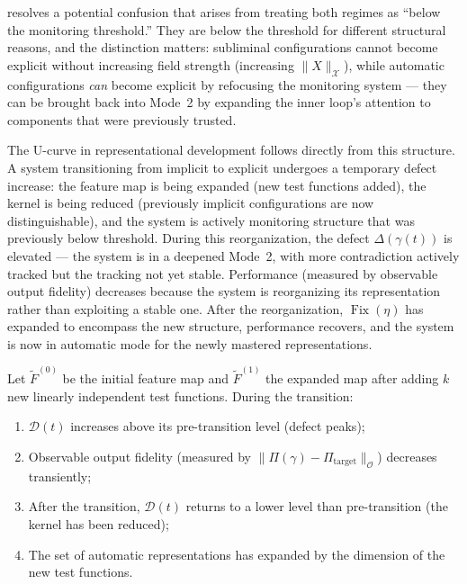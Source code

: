 \documentclass[12pt, oneside]{memoir}
\DeclareMathOperator{\Fix}{Fix}
\newcommand{\X}{\mathcal{X}}
\newcommand{\OO}{\mathcal{O}}
\newcommand{\Ft}{\widetilde{F}}
\newcommand{\nnorm}[1]{\lVert #1 \rVert}
\begin{document}
 resolves a potential confusion that arises from treating
both regimes as ``below the monitoring threshold.''  They are below the threshold for
different structural reasons, and the distinction matters: subliminal configurations
cannot become explicit without increasing field strength (increasing $\nnorm{X}_\X$),
while automatic configurations \emph{can} become explicit by refocusing the monitoring
system — they can be brought back into Mode~2 by expanding the inner loop's attention
to components that were previously trusted.

The U-curve in representational development follows directly from this structure.  A
system transitioning from implicit to explicit undergoes a temporary defect increase:
the feature map is being expanded (new test functions added), the kernel is being reduced
(previously implicit configurations are now distinguishable), and the system is actively
monitoring structure that was previously below threshold.  During this reorganization,
the defect $\Delta(\gamma(t))$ is elevated — the system is in a deepened Mode~2, with
more contradiction actively tracked but the tracking not yet stable.  Performance
(measured by observable output fidelity) decreases because the system is reorganizing
its representation rather than exploiting a stable one.  After the reorganization,
$\Fix(\eta)$ has expanded to encompass the new structure, performance recovers, and the
system is now in automatic mode for the newly mastered representations.

\begin{proposition}
\label{prop:U-curve}
Let $\Ft^{(0)}$ be the initial feature map and $\Ft^{(1)}$ the expanded map after
adding $k$ new linearly independent test functions.  During the transition:
\begin{enumerate}
  \item $\mathcal{D}(t)$ increases above its pre-transition level (defect peaks);
  \item Observable output fidelity (measured by $\nnorm{\Pi(\gamma) - \Pi_\mathrm{target}}_\OO$)
        decreases transiently;
  \item After the transition, $\mathcal{D}(t)$ returns to a lower level than
        pre-transition (the kernel has been reduced);
  \item The set of automatic representations has expanded by the dimension of the new
        test functions.
\end{enumerate}
\end{proposition}
\end{document}
